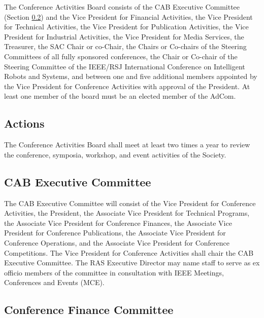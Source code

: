 \documentclass[10pt]{article}
\newcommand{\secref}[1]{Section \ref{#1}}
\begin{document}
The Conference Activities Board consists of the CAB Executive Committee (\secref{CAB:ExCom}) and the Vice President for Financial Activities, the Vice President for Technical Activities, the Vice President for Publication Activities,  the Vice President for Industrial Activities, the Vice President for Media Services, the Treasurer, the SAC Chair or co-Chair, the Chairs or Co-chairs of the Steering Committees of all fully sponsored conferences, the Chair or Co-chair of the Steering Committee of the IEEE/RSJ International Conference on Intelligent Robots and Systems, and between one and five additional members appointed by the Vice President for Conference Activities with approval of the President. At least one member of the board must be an elected member of the AdCom.  

\subsection{Actions}

The Conference Activities Board shall meet at least two times a year to review the conference, symposia, workshop, and event activities of the Society.


\subsection{CAB Executive Committee}
\label{CAB:ExCom}

The CAB Executive Committee will consist of the Vice President for Conference Activities, the President, the Associate Vice President for Technical Programs, the Associate Vice President for Conference Finances, the Associate Vice President for Conference Publications, the Associate Vice President for Conference Operations, and the Associate Vice President for Conference Competitions. The Vice President for Conference Activities shall chair the CAB Executive Committee. The RAS Executive Director may name staff to serve as ex officio members of the committee in consultation with IEEE Meetings, Conferences and Events (MCE).


\subsection{Conference Finance Committee}
\end{document}
